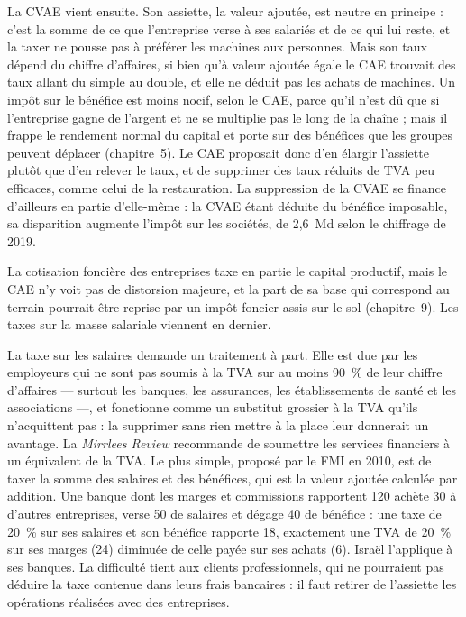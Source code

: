 \documentclass[11pt,a4paper]{article}
\providecommand{\euro}{\texteuro}
\begin{document}
La CVAE vient ensuite. Son assiette, la valeur ajoutée, est neutre en principe : c'est la somme de
ce que l'entreprise verse à ses salariés et de ce qui lui reste, et la taxer ne pousse pas à
préférer les machines aux personnes. Mais son taux dépend du chiffre d'affaires, si bien qu'à
valeur ajoutée égale le CAE trouvait des taux allant du simple au double, et elle ne déduit pas les
achats de machines. Un impôt sur le bénéfice est moins nocif, selon le CAE, parce qu'il n'est dû
que si l'entreprise gagne de l'argent et ne se multiplie pas le long de la chaîne ; mais il frappe
le rendement normal du capital et porte sur des bénéfices que les groupes peuvent déplacer
(chapitre~5). Le CAE proposait donc d'en élargir l'assiette plutôt que d'en relever le taux, et de
supprimer des taux réduits de TVA peu efficaces, comme celui de la restauration. La suppression de
la CVAE se finance d'ailleurs en partie d'elle-même : la CVAE étant déduite du bénéfice imposable,
sa disparition augmente l'impôt sur les sociétés, de 2,6~Md\euro{} selon le chiffrage de 2019.

La cotisation foncière des entreprises taxe en partie le capital productif, mais le CAE n'y voit pas
de distorsion majeure, et la part de sa base qui correspond au terrain pourrait être reprise par un
impôt foncier assis sur le sol (chapitre~9). Les taxes sur la masse salariale viennent en dernier.

La taxe sur les salaires demande un traitement à part. Elle est due par les employeurs qui ne sont
pas soumis à la TVA sur au moins 90~\% de leur chiffre d'affaires --- surtout les banques, les
assurances, les établissements de santé et les associations ---, et fonctionne comme un substitut
grossier à la TVA qu'ils n'acquittent pas : la supprimer sans rien mettre à la place leur donnerait
un avantage. La \emph{Mirrlees Review} recommande de soumettre les services financiers à un
équivalent de la TVA. Le plus simple, proposé par le FMI en 2010, est de taxer la somme des salaires
et des bénéfices, qui est la valeur ajoutée calculée par addition. Une banque dont les marges et
commissions rapportent 120 achète 30 à d'autres entreprises, verse 50 de salaires et dégage 40 de
bénéfice : une taxe de 20~\% sur ses salaires et son bénéfice rapporte 18, exactement une TVA de
20~\% sur ses marges (24) diminuée de celle payée sur ses achats (6). Israël l'applique à ses
banques. La difficulté tient aux clients professionnels, qui ne pourraient pas déduire la taxe
contenue dans leurs frais bancaires : il faut retirer de l'assiette les opérations réalisées avec
des entreprises.
\end{document}
